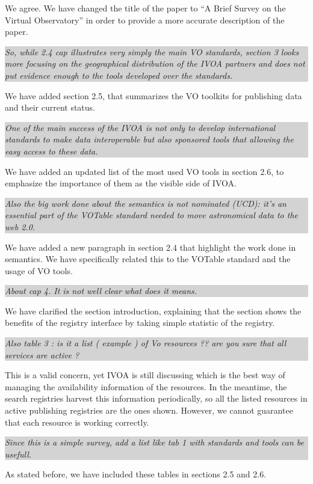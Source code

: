 \documentclass[a4paper]{article}
\newcommand{\quoting}[1]{
  
  
  \colorbox{lightgray}{
    \begin{minipage}{0.98\linewidth}
      \em #1
    \end{minipage}
  }
  
  
}
\begin{document}
We agree. We have changed the title of
the paper to ``A Brief Survey on the Virtual Observatory'' in order to provide
a more accurate description of the paper.
\vspace{0.5cm}

\quoting{
So, while 2.4 cap illustrates very simply the main VO standards, section 3 looks
more focusing on the geographical distribution of the IVOA partners and does not
put evidence enough to the tools developed over the standards.
}
\vspace{0.5cm}
We have added section 2.5, that summarizes the VO toolkits for publishing data
and their current status.
\vspace{0.5cm}

\quoting{
One of the main
success of the IVOA is not only to develop international standards to make data
interoperable but also sponsored tools that allowing the easy access to these
data.
}
\vspace{0.5cm}

We have added an updated list of the most used VO tools in section 2.6, to emphasize the 
importance of them as the visible side of IVOA. 
\vspace{0.5cm}

\quoting{
Also the big work done about the semantics is not nominated (UCD): it's an
essential part of the VOTable standard needed to move astronomical data to the
web 2.0.
}
\vspace{0.5cm}


We have added a new paragraph in section 2.4 that highlight the work done in
semantics. We have specifically related this to the VOTable standard and
the usage of VO tools.
\vspace{0.5cm}

\quoting{
About cap 4. It is not well clear what does it means. 
}
\vspace{0.5cm}

We have clarified the section introduction, explaining that the section
shows the benefits of the registry interface by taking simple statistic
of the registry. 
\vspace{0.5cm}

\quoting{
Also table 3 : is it a list ( example ) of Vo resources ??  are you sure that
all services are active ?
}
\vspace{0.5cm}

This is a valid concern, yet IVOA is still discussing which is the
best way of managing the availability information of the resources. 
In the meantime, the search registries harvest this information
periodically, so all the listed resources in active publishing registries
are the ones shown. However, we cannot guarantee that each resource is
working correctly.
\vspace{0.5cm}

\quoting{
Since this is a simple survey, add a list like tab 1 with standards and tools
can be usefull.
}
\vspace{0.5cm}

As stated before, we have included these tables in sections 2.5 and 2.6.

\vspace{0.5cm}
\end{document}
